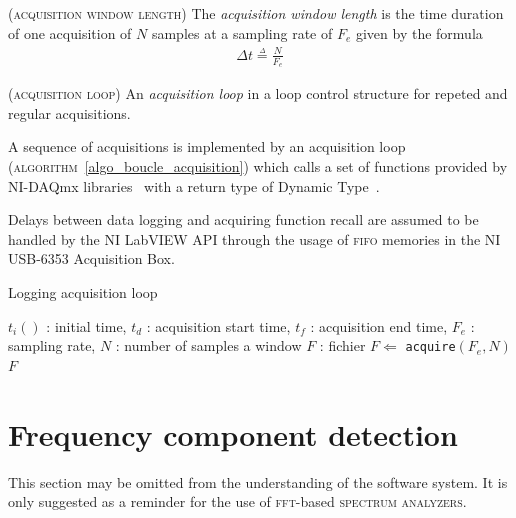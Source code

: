 \documentclass[a4paper]{report}
\newenvironment{definition}[1][Definition.]{\begin{trivlist}
\item[\hskip \labelsep {\bfseries #1}]}{\end{trivlist}}
\newenvironment{remark}[1][Remark.]{\begin{trivlist}
\item[\hskip \labelsep {\bfseries #1}]}{\end{trivlist}}
\begin{document}
\begin{definition}
  (\textsc{acquisition window length})
  The \textit{acquisition window length} is the time duration of one acquisition of $N$ samples at a sampling rate of $F_e$ given by the formula
  \begin{eqnarray*}
    \Delta t \overset{\underset{\Delta}{}}{=} \frac{N}{F_e}
  \end{eqnarray*}
\end{definition}

\begin{definition}
  (\textsc{acquisition loop})
  An \textit{acquisition loop} in a loop control structure for repeted and regular acquisitions.
\end{definition}

A sequence of acquisitions is implemented by an acquisition loop (\textsc{algorithm}~\ref{algo_boucle_acquisition}) which calls a set of functions provided by NI-DAQmx libraries~\cite{NI_acquisition_design_ref} with a return type of Dynamic Type~\cite{NI_Dynamic_data}.


\begin{remark}
  Delays between data logging and acquiring function recall are assumed to be handled by the NI LabVIEW API through the usage of \textsc{fifo} memories in the NI USB-6353 Acquisition Box\cite{NI_6353_datasheet}.
\end{remark}

\begin{algorithm}[h]
\caption{Logging acquisition loop}
\label{algo_boucle_acquisition}
\begin{algorithmic}[1]
  \REQUIRE $t_i()$ : initial time, $t_d$ : acquisition start time, $t_f$ : acquisition end time, $F_e$ : sampling rate, $N$ : number of samples a window
  \STATE $F$ : fichier
  \STATE $F \Leftarrow$ \texttt{acquire}$(F_e, N)$
  \ENDWHILE
  \RETURN $F$
\end{algorithmic}
\end{algorithm}


\section{Frequency component detection}

{ \color{rltred}{\Radioactivity} } This section may be omitted from the understanding of the software system. It is only suggested as a reminder for the use of \textsc{fft}-based \textsc{spectrum analyzers}.
\end{document}

